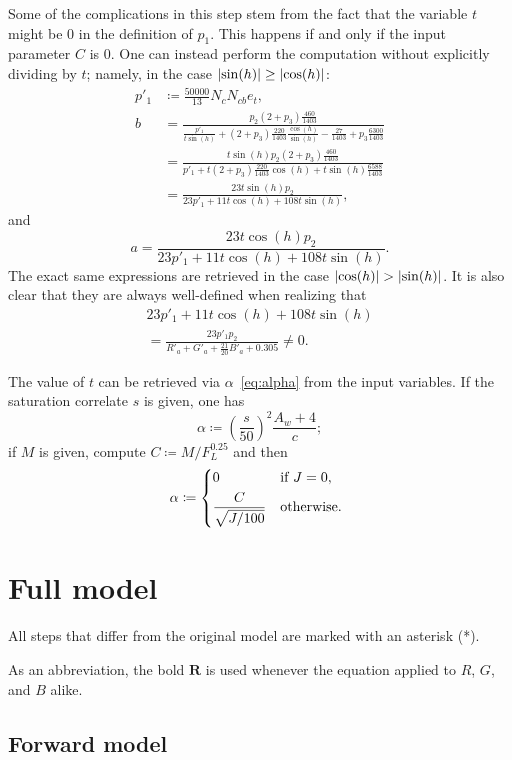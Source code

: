 \documentclass[twocolumn]{scrartcl}
\theoremstyle{named}
\DeclarePairedDelimiter\abs{\lvert}{\rvert}%
\newcommand\rgb{\bm{R}}
\begin{document}
Some of the complications in this step stem from the fact that the variable $t$
might be $0$ in the definition of $p_1$. This happens if and only if the input
parameter $C$ is $0$.
One can instead perform the computation without explicitly dividing by $t$;
namely, in the case $\abs{\sin(h)} \ge \abs{\cos(h)}$:
\begin{align*}
  p'_1 &\coloneqq \frac{50000}{13} N_c N_{cb} e_t,\\
  b &= \frac{p_2 (2+p_3) \frac{460}{1403}}{\frac{p'_1}{t\sin(h)} + (2+p_3) \frac{220}{1403} \frac{\cos(h)}{\sin(h)} - \frac{27}{1403} + p_3 \frac{6300}{1403}}\\
   &= \frac{t \sin(h) p_2 (2+p_3) \frac{460}{1403}}{p'_1 + t (2+p_3) \frac{220}{1403} \cos(h) + t \sin(h) \frac{6588}{1403}}\\
   &= \frac{23 t \sin(h) p_2}{23 p'_1 + 11 t \cos(h) + 108 t \sin(h)},
\end{align*}
and
\[
  a = \frac{23 t \cos(h) p_2}{23 p'_1 + 11 t \cos(h) + 108 t \sin(h)}.
\]
The exact same expressions are retrieved in the case
$\abs{\cos(h)} > \abs{\sin(h)}$.
It is also clear that they are always well-defined when realizing that
\begin{multline*}
  23 p'_1 + 11 t \cos(h) + 108 t \sin(h)\\
  = \frac{23 p'_1 p_2}{R'_a + G'_a + \tfrac{21}{20}B'_a + 0.305}
  \neq 0.
\end{multline*}

The value of $t$ can be retrieved via $\alpha$~\eqref{eq:alpha} from the input
variables.  If the saturation correlate $s$ is given, one has
\[
  \alpha \coloneqq {\left(\frac{s}{50}\right)}^2 \frac{A_w+4}{c};
\]
if $M$ is given, compute $C\coloneqq M / F_L^{0.25}$ and then
\[
\alpha\coloneqq\begin{dcases*}
  0 &if $J=0$,\\
  \frac{C}{\sqrt{J/100}}&otherwise.
\end{dcases*}\]



\section{Full model}

All steps that differ from the original model are marked with an asterisk (*).

As an abbreviation, the bold $\rgb$ is used whenever the equation applied
to $R$, $G$, and $B$ alike.

\subsection{Forward model}
\end{document}
